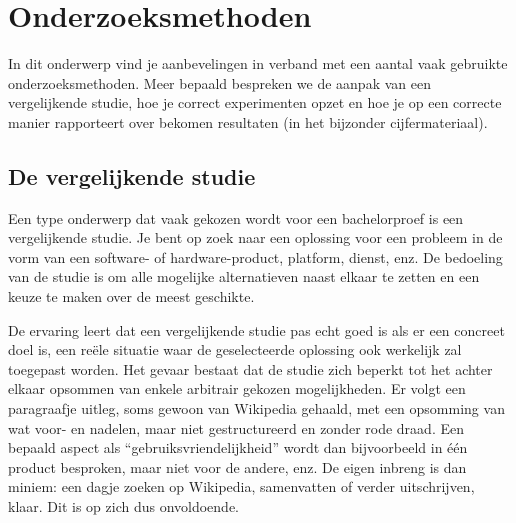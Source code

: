 \chapter{Onderzoeksmethoden}
\label{ch:onderzoeksmethoden}

In dit onderwerp vind je aanbevelingen in verband met een aantal vaak gebruikte onderzoeksmethoden. Meer bepaald bespreken we de aanpak van een vergelijkende studie, hoe je correct experimenten opzet en hoe je op een correcte manier rapporteert over bekomen resultaten (in het bijzonder cijfermateriaal).

%
%

\section{De vergelijkende studie}
\label{sec:vergelijkende-studie}

Een type onderwerp dat vaak gekozen wordt voor een bachelorproef is een vergelijkende studie. Je bent op zoek naar een oplossing voor een probleem in de vorm van een software- of hardware-product, platform, dienst, enz. De bedoeling van de studie is om alle mogelijke alternatieven naast elkaar te zetten en een keuze te maken over de meest geschikte.

De ervaring leert dat een vergelijkende studie pas echt goed is als er een concreet doel is, een reële situatie waar de geselecteerde oplossing ook werkelijk zal toegepast worden. Het gevaar bestaat dat de studie zich beperkt tot het achter elkaar opsommen van enkele arbitrair gekozen mogelijkheden. Er volgt een paragraafje uitleg, soms gewoon van Wikipedia gehaald, met een opsomming van wat voor- en nadelen, maar niet gestructureerd en zonder rode draad. Een bepaald aspect als ``gebruiksvriendelijkheid'' wordt dan bijvoorbeeld in één product besproken, maar niet voor de andere, enz. De eigen inbreng is dan miniem: een dagje zoeken op Wikipedia, samenvatten of verder uitschrijven, klaar. Dit is op zich dus onvoldoende.

